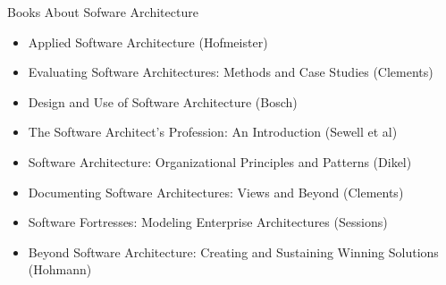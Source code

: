 \documentclass[aspectratio=1610,xcolor=dvipsnames,t,compress]{beamer}
\begin{document}
\begin{frame}{Books About Sofware Architecture}
    \begin{itemize}
        \item Applied Software Architecture (Hofmeister)
        \item Evaluating Software Architectures: Methods and Case Studies (Clements)
        \item Design and Use of Software Architecture (Bosch)
        \item The Software Architect’s Profession: An Introduction (Sewell et al)
        \item Software Architecture: Organizational Principles and Patterns (Dikel)
        \item Documenting Software Architectures: Views and Beyond (Clements)
        \item Software Fortresses: Modeling Enterprise Architectures (Sessions)
        \item Beyond Software Architecture: Creating and Sustaining Winning Solutions (Hohmann)
    \end{itemize}
\end{frame}
\end{document}
